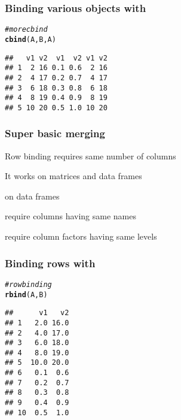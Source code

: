 \documentclass[12pt]{beamer}\usepackage[]{graphicx}\usepackage[]{color}
\makeatletter
\newcommand{\hlcom}[1]{\textcolor[rgb]{0.678,0.584,0.686}{\textit{#1}}}%
\newcommand{\hlstd}[1]{\textcolor[rgb]{0.345,0.345,0.345}{#1}}%
\newcommand{\hlkwd}[1]{\textcolor[rgb]{0.737,0.353,0.396}{\textbf{#1}}}%
\newenvironment{kframe}{%
 \def\at@end@of@kframe{}%
 \ifinner\ifhmode%
  \def\at@end@of@kframe{\end{minipage}}%
  \begin{minipage}{\columnwidth}%
 \fi\fi%
 \def\FrameCommand##1{\hskip\@totalleftmargin \hskip-\fboxsep
 \colorbox{shadecolor}{##1}\hskip-\fboxsep
     \hskip-\linewidth \hskip-\@totalleftmargin \hskip\columnwidth}%
 \MakeFramed {\advance\hsize-\width
   \@totalleftmargin\z@ \linewidth\hsize
   \@setminipage}}%
 {\par\unskip\endMakeFramed%
 \at@end@of@kframe}
\newenvironment{knitrout}{}{} %
\makeatother
\begin{document}
\begin{frame}[fragile]
\frametitle{Binding various objects with }

\begin{knitrout}\footnotesize
{}\color{fgcolor}\begin{kframe}
\begin{alltt}
\hlcom{# more cbind}
\hlkwd{cbind}\hlstd{(A, B, A)}
\end{alltt}
\begin{verbatim}
##   v1 v2  v1  v2 v1 v2
## 1  2 16 0.1 0.6  2 16
## 2  4 17 0.2 0.7  4 17
## 3  6 18 0.3 0.8  6 18
## 4  8 19 0.4 0.9  8 19
## 5 10 20 0.5 1.0 10 20
\end{verbatim}
\end{kframe}
\end{knitrout}

\end{frame}


\begin{frame}[fragile]
\frametitle{Super basic merging}

\bi
  \item Row binding requires same number of columns
  \item It works on matrices and data frames
  \item {} on data frames
  \bi
    \item require columns having same names
    \item require column factors having same levels
  \ei
\ei

\end{frame}


\begin{frame}[fragile]
\frametitle{Binding rows with }

\begin{knitrout}\footnotesize
{}\color{fgcolor}\begin{kframe}
\begin{alltt}
\hlcom{# row binding}
\hlkwd{rbind}\hlstd{(A, B)}
\end{alltt}
\begin{verbatim}
##      v1   v2
## 1   2.0 16.0
## 2   4.0 17.0
## 3   6.0 18.0
## 4   8.0 19.0
## 5  10.0 20.0
## 6   0.1  0.6
## 7   0.2  0.7
## 8   0.3  0.8
## 9   0.4  0.9
## 10  0.5  1.0
\end{verbatim}
\end{kframe}
\end{knitrout}

\end{frame}
\end{document}
